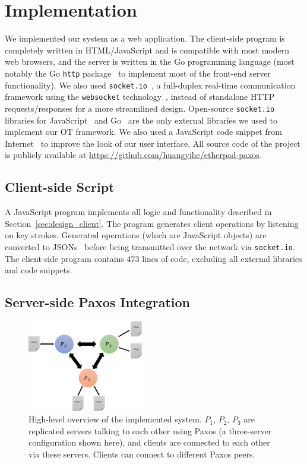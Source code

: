 \section{Implementation}

We implemented our system as a web application. The client-side program is
completely written in HTML/JavaScript and is compatible with most modern web
browsers, and the server is written in the Go programming language (most notably
the Go {\tt http} package~\cite{gohttp} to implement most of the front-end
server functionality). We also used {\tt socket.io}~\cite{socketio}, a full-duplex
real-time communication framework using the {\tt websocket}
technology~\cite{websock}, instead of standalone HTTP requests/responses for a
more streamlined design. Open-source {\tt socket.io} libraries for
JavaScript~\cite{jssocketio} and Go~\cite{gosocketio} are the only external
libraries we used to implement our OT framework. We also used a JavaScript code
snippet from Internet~\cite{linenumber} to improve the look of our user
interface. All source code of the project is publicly available at
\url{https://github.com/huangyihe/etherpad-paxos}.

\subsection{Client-side Script}

A JavaScript program implements all logic and functionality described in
Section~\ref{sec:design_client}. The program generates client operations by
listening on key strokes. Generated operations (which are JavaScript objects)
are converted to JSONs~\cite{json} before being transmitted over the network via
{\tt socket.io}. The client-side program contains 473 lines of code, excluding
all external libraries and code snippets.

\subsection{Server-side Paxos Integration}

\begin{figure}[t!]
  \centering
  \includegraphics[width=0.45\textwidth]{system_overview.png}

  \caption{High-level overview of the implemented system. $P_1$, $P_2$, $P_3$
  are replicated servers talking to each other using Paxos (a three-server
  configuration shown here), and clients are connected to each other via these
  servers. Clients can connect to different Paxos peers.}
  
  \label{fig:system}
\end{figure}

